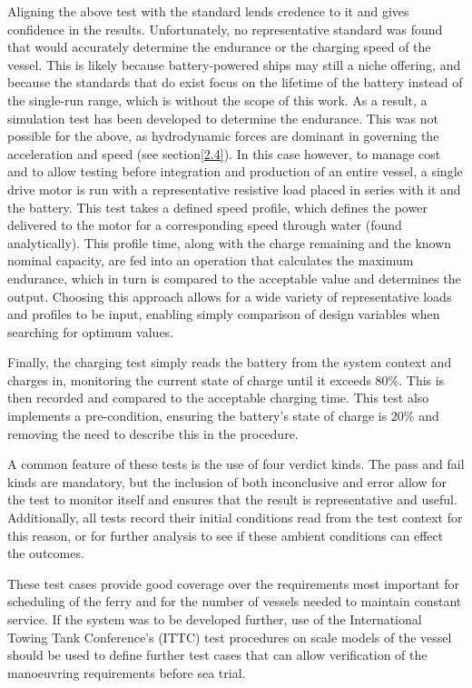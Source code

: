 \documentclass[../main.tex]{subfiles}
\begin{document}
Aligning the above test with the standard lends credence to it and gives confidence in the results.
Unfortunately, no representative standard was found that would accurately determine the endurance or the charging speed of the vessel.
This is likely because battery-powered ships may still a niche offering, and because the standards that do exist focus on the lifetime of the battery instead of the single-run range, which is without the scope of this work.
As a result, a simulation test has been developed to determine the endurance.
This was not possible for the above, as hydrodynamic forces are dominant in governing the acceleration and speed (see section\ref{2.4}).
In this case however, to manage cost and to allow testing before integration and production of an entire vessel, a single drive motor is run with a representative resistive load placed in series with it and the battery.
This test takes a defined speed profile, which defines the power delivered to the motor for a corresponding speed through water (found analytically).
This profile time, along with the charge remaining and the known nominal capacity, are fed into an operation that calculates the maximum endurance, which in turn is compared to the acceptable value and determines the output.
Choosing this approach allows for a wide variety of representative loads and profiles to be input, enabling simply comparison of design variables when searching for optimum values.

Finally, the charging test simply reads the battery from the system context and charges in, monitoring the current state of charge until it exceeds 80\%.
This is then recorded and compared to the acceptable charging time.
This test also implements a pre-condition, ensuring the battery's state of charge is 20\% and removing the need to describe this in the procedure.

A common feature of these tests is the use of four verdict kinds.
The pass and fail kinds are mandatory, but the inclusion of both inconclusive and error allow for the test to monitor itself and ensures that the result is representative and useful.
Additionally, all tests record their initial conditions read from the test context for this reason, or for further analysis to see if these ambient conditions can effect the outcomes.

These test cases provide good coverage over the requirements most important for scheduling of the ferry and for the number of vessels needed to maintain constant service.
If the system was to be developed further, use of the International Towing Tank Conference's (ITTC) test procedures\cite{ITTC2021} on scale models of the vessel should be used to define further test cases that can allow verification of the manoeuvring requirements before sea trial.
\end{document}
